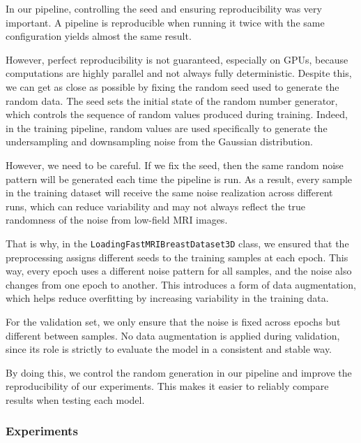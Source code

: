 \documentclass[12pt]{article}
\begin{document}
In our pipeline, controlling the seed and ensuring reproducibility was very important. A pipeline is reproducible when running it twice
with the same configuration yields almost the same result.
\vspace{0.5cm}

However, perfect reproducibility is not guaranteed, especially on GPUs, because computations are highly parallel and not always fully deterministic.
Despite this, we can get as close as possible by fixing the random seed used to generate the random data. The seed sets the initial state of
the random number generator, which controls the sequence of random values produced during training. Indeed, in the training pipeline, random values are used
specifically to generate the undersampling and downsampling noise from the Gaussian distribution.
\vspace{0.5cm}

However, we need to be careful. If we fix the seed, then the same random noise pattern will be generated each time the pipeline is run. As a result, every
sample in the training dataset will receive the same noise realization across different runs, which can reduce variability and may not always reflect the true
randomness of the noise from low-field MRI images.
\vspace{0.5cm}

That is why, in the \texttt{LoadingFastMRIBreastDataset3D} class, we ensured that the preprocessing assigns different seeds to the training samples at each epoch.
This way, every epoch uses a different noise pattern for all samples, and the noise also changes from one epoch to another. This introduces a form of
data augmentation, which helps reduce overfitting by increasing variability in the training data.
\vspace{0.5cm}

For the validation set, we only ensure that the noise is fixed across epochs but different between samples. No data augmentation is applied during validation,
since its role is strictly to evaluate the model in a consistent and stable way.
\vspace{0.5cm}

By doing this, we control the random generation in our pipeline and improve the reproducibility of our experiments. This makes it easier to reliably compare results when testing each model.

\subsubsection{Experiments} 
\end{document}
